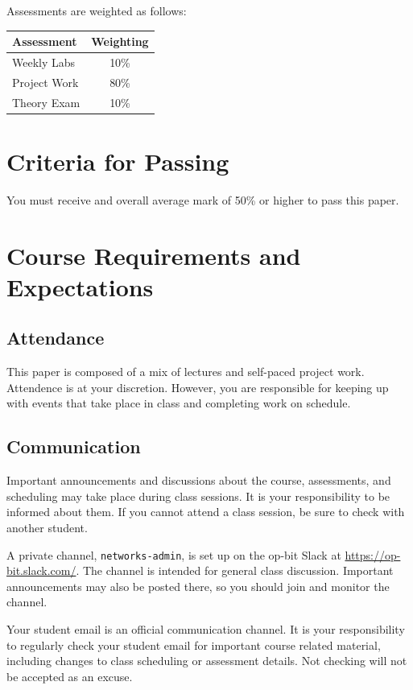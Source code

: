\documentclass{article}
\begin{document}
Assessments are weighted as follows: \\
\begin{tabular}{|l|c|}
\hline
Assessment                  &  Weighting \\ \hline
Weekly Labs                 &  10\% \\ \hline
Project Work                &  80\% \\ \hline
Theory Exam                 &  10\% \\ \hline
\end{tabular}

\section*{Criteria for Passing}
You must receive and overall average mark of 50\% or higher to pass this paper.

\section*{Course Requirements and Expectations}
\subsection*{Attendance}
This paper is composed of a mix of lectures and self-paced project work.  Attendence is at your discretion. 
However, you are responsible for keeping up with events that take place in class and completing work on schedule. 

\subsection*{Communication}
Important announcements and discussions about the course, assessments, and scheduling may take place during class sessions.  It is your responsibility to be informed about them.  If you cannot attend a class session, be sure to check with another student.

A private channel, \texttt{networks-admin}, is set up on the op-bit Slack at \url{https://op-bit.slack.com/}.  The channel is intended for general class discussion.  Important announcements may also be posted there, so you should join and monitor the channel.

Your student email is an official communication channel. It is your responsibility to regularly check your student email for important course related material, including changes to class scheduling or assessment details. Not checking will not be accepted as an excuse.
\end{document}
